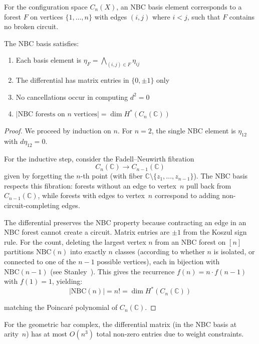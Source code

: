 \begin{definition}
For the configuration space $C_n(X)$, an NBC basis element corresponds to a forest $F$ on vertices $\{1,\ldots,n\}$ with edges $(i,j)$ where $i < j$, such that $F$ contains no broken circuit.
\end{definition}
 
\begin{theorem}
\label{thm:nbc-basis-optimality}
The NBC basis satisfies:
\begin{enumerate}
\item Each basis element is $\eta_F = \bigwedge_{(i,j) \in F} \eta_{ij}$
\item The differential has matrix entries in $\{0, \pm 1\}$ only
\item No cancellations occur in computing $d^2 = 0$
\item $|\text{NBC forests on $n$ vertices}| = \dim H^*(C_n(\mathbb{C}))$
\end{enumerate}
\end{theorem}

\begin{proof}
We proceed by induction on $n$. For $n = 2$, the single NBC element is $\eta_{12}$ with $d\eta_{12} = 0$.
 
For the inductive step, consider the Fadell--Neuwirth fibration
\[
C_n(\mathbb{C}) \to C_{n-1}(\mathbb{C})
\]
given by forgetting the $n$-th point (with fiber $\mathbb{C} \setminus \{z_1, \ldots, z_{n-1}\}$). The NBC basis respects this fibration: forests without an edge to vertex~$n$ pull back from $C_{n-1}(\mathbb{C})$, while forests with edges to vertex~$n$ correspond to adding non-circuit-completing edges.
 
The differential preserves the NBC property because contracting an edge in an NBC forest cannot create a circuit. Matrix entries are $\pm 1$ from the Koszul sign rule. For the count, deleting the largest vertex $n$ from an NBC forest on $[n]$ partitions $\mathrm{NBC}(n)$ into exactly $n$ classes (according to whether $n$ is isolated, or connected to one of the $n-1$ possible vertices), each in bijection with $\mathrm{NBC}(n-1)$ (see Stanley~\cite{Sta97}). This gives the recurrence $f(n) = n \cdot f(n-1)$ with $f(1) = 1$, yielding:
\[
|\text{NBC}(n)| = n! = \dim H^*(C_n(\mathbb{C}))
\]

matching the Poincaré polynomial of $C_n(\mathbb{C})$.
\end{proof}

\begin{proposition}\label{prop:nbc-sparsity}
For the geometric bar complex, the differential matrix (in the NBC basis at arity~$n$) has at most $O(n^3)$ total non-zero entries due to weight constraints.
\end{proposition}

